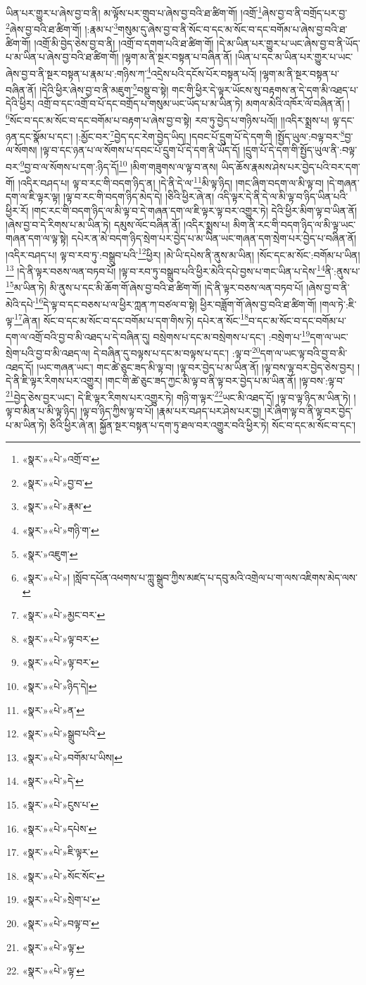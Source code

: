 ཡིན་པར་གྱུར་པ་ཞེས་བྱ་བ་ནི། མ་ལྟོས་པར་གྲུབ་པ་ཞེས་བྱ་བའི་ཐ་ཚིག་གོ། །འགྲོ་\footnote{«སྣར་»«པེ་»འགྲོ་བ་}ཞེས་བྱ་བ་ནི་བགྲོད་པར་བྱ་\footnote{«སྣར་»«པེ་»བྱ་བ་}ཞེས་བྱ་བའི་ཐ་ཚིག་གོ། །:རྣམ་པ་\footnote{«སྣར་»«པེ་»རྣམ་}གསུམ་དུ་ཞེས་བྱ་བ་ནི་སོང་བ་དང་མ་སོང་བ་དང་བགོམ་པ་ཞེས་བྱ་བའི་ཐ་ཚིག་གོ། །འགྲོ་མི་བྱེད་ཅེས་བྱ་བ་ནི། །འགྲོ་བ་དགག་པའི་ཐ་ཚིག་གོ། །དེ་མ་ཡིན་པར་གྱུར་པ་ཡང་ཞེས་བྱ་བ་ནི་ཡོད་པ་མ་ཡིན་པ་ཞེས་བྱ་བའི་ཐ་ཚིག་གོ། །ལྷག་མ་ནི་སྔར་བསྟན་པ་བཞིན་ནོ། །ཡིན་པ་དང་མ་ཡིན་པར་གྱུར་པ་ཡང་ཞེས་བྱ་བ་ནི་སྔར་བསྟན་པ་རྣམ་པ་:གཉིས་ཀ་\footnote{«སྣར་»«པེ་»གཉི་ག་}འདྲེས་པའི་དངོས་པོར་བསྟན་པའོ། །ལྷག་མ་ནི་སྔར་བསྟན་པ་བཞིན་ནོ། །དེའི་ཕྱིར་ཞེས་བྱ་བ་ནི་མཇུག་\footnote{«སྣར་»འཇུག་}བསྡུ་བ་སྟེ། གང་གི་ཕྱིར་དེ་ལྟར་ཡོངས་སུ་བརྟགས་ན་དེ་དག་མི་འཐད་པ་དེའི་ཕྱིར། འགྲོ་བ་དང་འགྲོ་བ་པོ་དང་བགྲོད་པ་གསུམ་ཡང་ཡོད་པ་མ་ཡིན་ཏེ། མགལ་མེའི་འཁོར་ལོ་བཞིན་ནོ། །\footnote{«སྣར་»«པེ་»། །སློབ་དཔོན་འཕགས་པ་ཀླུ་སྒྲུབ་ཀྱིས་མཛད་པ་དབུ་མའི་འགྲེལ་པ་ག་ལས་འཇིགས་མེད་ལས་}སོང་བ་དང་མ་སོང་བ་དང་བགོམ་པ་བརྟག་པ་ཞེས་བྱ་བ་སྟེ། རབ་ཏུ་བྱེད་པ་གཉིས་པའོ།། །།འདིར་སྨྲས་པ། ལྟ་དང་ཉན་དང་སྣོམ་པ་དང་། །:མྱོང་བར་\footnote{«སྣར་»«པེ་»མྱང་བར་}བྱེད་དང་རེག་བྱེད་ཡིད། །དབང་པོ་དྲུག་པོ་དེ་དག་གི །སྤྱོད་ཡུལ་:བལྟ་བར་\footnote{«སྣར་»«པེ་»ལྟ་བར་}བྱ་ལ་སོགས། །ལྟ་བ་དང་ཉན་པ་ལ་སོགས་པ་དབང་པོ་དྲུག་པོ་དེ་དག་ནི་ཡོད་དོ། །དྲུག་པོ་དེ་དག་གི་སྤྱོད་ཡུལ་ནི་:བལྟ་བར་\footnote{«སྣར་»«པེ་»ལྟ་བར་}བྱ་བ་ལ་སོགས་པ་དག་:ཉིད་དོ།\footnote{«སྣར་»«པེ་»ཉིད་དེ།} །མིག་གཟུགས་ལ་ལྟ་བ་ནས། ཡིད་ཆོས་རྣམས་ཤེས་པར་བྱེད་པའི་བར་དག་གོ། །འདིར་བཤད་པ། ལྟ་བ་རང་གི་བདག་ཉིད་ན། །དེ་ནི་དེ་ལ་\footnote{«སྣར་»«པེ་»ན་}མི་ལྟ་ཉིད། །གང་ཞིག་བདག་ལ་མི་ལྟ་བ། །དེ་གཞན་དག་ལ་ཇི་ལྟར་ལྟ། །ལྟ་བ་རང་གི་བདག་ཉིད་མེད་དེ། །ཅིའི་ཕྱིར་ཞེ་ན། འདི་ལྟར་དེ་ནི་དེ་ལ་མི་ལྟ་བ་ཉིད་ཡིན་པའི་ཕྱིར་རོ། །གང་རང་གི་བདག་ཉིད་ལ་མི་ལྟ་བ་དེ་གཞན་དག་ལ་ཇི་ལྟར་ལྟ་བར་འགྱུར་ཏེ། དེའི་ཕྱིར་མིག་ལྟ་བ་ཡིན་ནོ། །ཞེས་བྱ་བ་དེ་རིགས་པ་མ་ཡིན་ཏེ། དམུས་ལོང་བཞིན་ནོ། །འདིར་སྨྲས་པ། མིག་ནི་རང་གི་བདག་ཉིད་ལ་མི་ལྟ་ཡང་གཞན་དག་ལ་ལྟ་སྟེ། དཔེར་ན་མེ་བདག་ཉིད་སྲེག་པར་བྱེད་པ་མ་ཡིན་ཡང་གཞན་དག་སྲེག་པར་བྱེད་པ་བཞིན་ནོ། །འདིར་བཤད་པ། ལྟ་བ་རབ་ཏུ་:བསྒྲུབ་པའི་\footnote{«སྣར་»«པེ་»སྒྲུབ་པའི་}ཕྱིར། །མེ་ཡི་དཔེས་ནི་ནུས་མ་ཡིན། །སོང་དང་མ་སོང་:བགོམ་པ་ཡིན།\footnote{«སྣར་»«པེ་»བགོམ་པ་ཡིས།} །དེ་ནི་ལྟར་བཅས་ལན་བཏབ་པོ། །ལྟ་བ་རབ་ཏུ་བསྒྲུབ་པའི་ཕྱིར་མེའི་དཔེ་བྱས་པ་གང་ཡིན་པ་དེས་\footnote{«སྣར་»«པེ་»དེ་}ནི་:ནུས་པ་\footnote{«སྣར་»«པེ་»ངུས་པ་}མ་ཡིན་ཏེ། མི་ནུས་པ་དང་མི་ཆོག་གོ་ཞེས་བྱ་བའི་ཐ་ཚིག་གོ། །དེ་ནི་ལྟར་བཅས་ལན་བཏབ་པོ། །ཞེས་བྱ་བ་ནི་མེའི་དཔེ་\footnote{«སྣར་»«པེ་»དཔེས་}དེ་ལྟ་བ་དང་བཅས་པ་ལ་ཕྱིར་ཀླན་ཀ་བཙལ་བ་སྟེ། ཕྱིར་བཟློག་གོ་ཞེས་བྱ་བའི་ཐ་ཚིག་གོ། །གལ་ཏེ་:ཇི་ལྟ་\footnote{«སྣར་»«པེ་»ཇི་ལྟར་}ཞེ་ན། སོང་བ་དང་མ་སོང་བ་དང་བགོམ་པ་དག་གིས་ཏེ། དཔེར་ན་སོང་\footnote{«སྣར་»«པེ་»སོང་སོང་}བ་དང་མ་སོང་བ་དང་བགོམ་པ་དག་ལ་འགྲོ་བའི་བྱ་བ་མི་འཐད་པ་དེ་བཞིན་དུ། བསྲེགས་པ་དང་མ་བསྲེགས་པ་དང་། :བསྲེག་པ་\footnote{«སྣར་»«པེ་»སྲེག་པ་}དག་ལ་ཡང་སྲེག་པའི་བྱ་བ་མི་འཐད་ལ། དེ་བཞིན་དུ་བལྟས་པ་དང་མ་བལྟས་པ་དང་། :ལྟ་བ་\footnote{«སྣར་»«པེ་»བལྟ་བ་}དག་ལ་ཡང་ལྟ་བའི་བྱ་བ་མི་འཐད་དོ། །ཡང་གཞན་ཡང་། གང་ཚེ་ཅུང་ཟད་མི་ལྟ་བ། །ལྟ་བར་བྱེད་པ་མ་ཡིན་ནོ། །ལྟ་བས་ལྟ་བར་བྱེད་ཅེས་བྱར། །དེ་ནི་ཇི་ལྟར་རིགས་པར་འགྱུར། །གང་གི་ཚེ་ཅུང་ཟད་ཀྱང་མི་ལྟ་བ་ནི་ལྟ་བར་བྱེད་པ་མ་ཡིན་ནོ། །ལྟ་བས་:ལྟ་བ་\footnote{«སྣར་»«པེ་»ལྟ་}བྱེད་ཅེས་བྱར་ཡང་། དེ་ཇི་ལྟར་རིགས་པར་འགྱུར་ཏེ། གཉི་ག་ལྟར་\footnote{«སྣར་»«པེ་»ལྟ་}ཡང་མི་འཐད་དོ། །ལྟ་བ་ལྟ་ཉིད་མ་ཡིན་ཏེ། །ལྟ་བ་མིན་པ་མི་ལྟ་ཉིད། །ལྟ་བ་ཉིད་ཀྱིས་ལྟ་བ་པོ། །རྣམ་པར་བཤད་པར་ཤེས་པར་བྱ། །རེ་ཞིག་ལྟ་བ་ནི་ལྟ་བར་བྱེད་པ་མ་ཡིན་ཏེ། ཅིའི་ཕྱིར་ཞེ་ན། སྐྱོན་སྔར་བསྟན་པ་དག་ཏུ་ཐལ་བར་འགྱུར་བའི་ཕྱིར་ཏེ། སོང་བ་དང་མ་སོང་བ་དང་། 